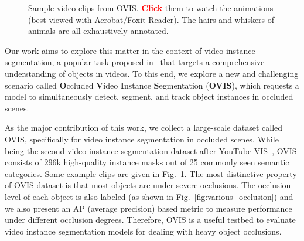 \documentclass[twocolumn]{svjour3}          \smartqed  \usepackage{graphicx}
\begin{document}
\begin{sloppypar}
\begin{figure}[tb]
\centering
   \subfigure
   {
   }
  \vspace{-2mm}
   \subfigure
   {
   }
  \vspace{-2mm}
   \subfigure
   {
   }
   \subfigure
   {
   }
   \subfigure
   {
   }
   \subfigure
   {
   }
   \caption{Sample video clips from OVIS. \textcolor{red}{\textbf{Click}} them to watch the animations (best viewed with Acrobat/Foxit Reader). The hairs and whiskers of animals are all exhaustively annotated.}
   \label{fig:anime}
\end{figure}

Our work aims to explore this matter in the context of video instance segmentation, a popular task proposed in~\cite{youtube_vis} that targets a comprehensive understanding of objects in videos. To this end, we explore a new and challenging scenario called \textbf{O}ccluded \textbf{V}ideo \textbf{I}nstance \textbf{S}egmentation (\textbf{OVIS}), which requests a model to simultaneously detect, segment, and track object instances in occluded scenes.

As the major contribution of this work, we collect a large-scale dataset called OVIS, specifically for video instance segmentation in occluded scenes. While being the second video instance segmentation dataset after YouTube-VIS~\cite{youtube_vis}, OVIS consists of 296k high-quality instance masks out of 25 commonly seen semantic categories. Some example clips are given in Fig.~\ref{fig:anime}. The most distinctive property of OVIS dataset is that most objects are under severe occlusions. The occlusion level of each object is also labeled (as shown in Fig.~\ref{fig:various_occlusion}) and we also present an AP (average precision) based metric to measure performance under different occlusion degrees. Therefore, OVIS is a useful testbed to evaluate video instance segmentation models for dealing with heavy object occlusions.


\end{sloppypar}
\end{document}
